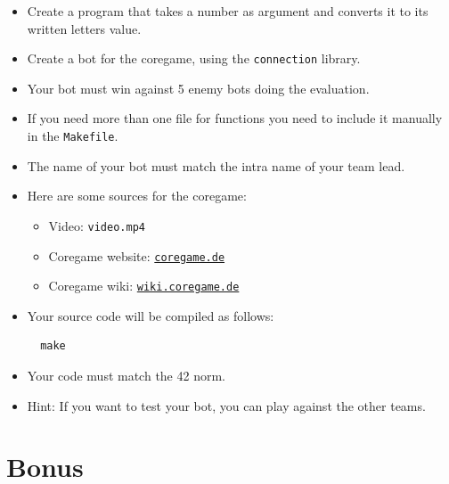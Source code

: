 \documentclass[12pt]{article}
\begin{document}
\begin{itemize}
  \item Create a program that takes a number as argument and converts it to its written letters value.
  
  \item Create a bot for the coregame, using the \texttt{connection} library.
  
  \item Your bot must win against 5 enemy bots doing the evaluation.
  
  \item If you need more than one file for functions you need to include it manually in the \texttt{Makefile}.
  
  \item The name of your bot must match the intra name of your team lead.
  
  \item Here are some sources for the coregame:
  \begin{itemize}
    \item Video: \texttt{video.mp4}
    \item Coregame website: \href{https://coregame.de}{\texttt{coregame.de}}
    \item Coregame wiki: \href{https://wiki.coregame.de}{\texttt{wiki.coregame.de}}
  \end{itemize}
  
  \item Your source code will be compiled as follows:
  
  \begin{verbatim}
  make
  \end{verbatim}
  
  \item Your code must match the 42 norm.
  
  \item Hint: If you want to test your bot, you can play against the other teams.
\end{itemize}

\newpage

\section{Bonus}
\end{document}
